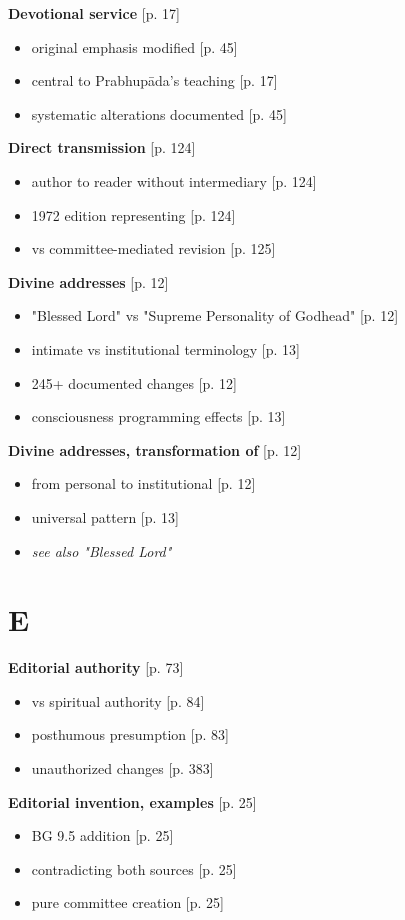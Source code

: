 \documentclass[11pt,twoside]{book}
\begin{document}
\textbf{\textbf{Devotional service}} {[}p. 17]
\begin{itemize}
\item original emphasis modified [p. 45]
\item central to Prabhupāda's teaching [p. 17]
\item systematic alterations documented [p. 45]
\end{itemize}

\textbf{\textbf{Direct transmission}} {[}p. 124]
\begin{itemize}
\item author to reader without intermediary [p. 124]
\item 1972 edition representing [p. 124]
\item vs committee-mediated revision [p. 125]
\end{itemize}

\textbf{\textbf{Divine addresses}} {[}p. 12]
\begin{itemize}
\item "Blessed Lord" vs "Supreme Personality of Godhead" [p. 12]
\item intimate vs institutional terminology [p. 13]
\item 245+ documented changes [p. 12]
\item consciousness programming effects [p. 13]
\end{itemize}

\textbf{\textbf{Divine addresses, transformation of}} {[}p. 12]
\begin{itemize}
\item from personal to institutional [p. 12]
\item universal pattern [p. 13]
\item \emph{see also "Blessed Lord"}
\end{itemize}
\section*{E}
\label{sec:org3a67c7d}

\textbf{\textbf{Editorial authority}} {[}p. 73]
\begin{itemize}
\item vs spiritual authority [p. 84]
\item posthumous presumption [p. 83]
\item unauthorized changes [p. 383]
\end{itemize}

\textbf{\textbf{Editorial invention, examples}} {[}p. 25]
\begin{itemize}
\item BG 9.5 addition [p. 25]
\item contradicting both sources [p. 25]
\item pure committee creation [p. 25]
\end{itemize}
\end{document}
